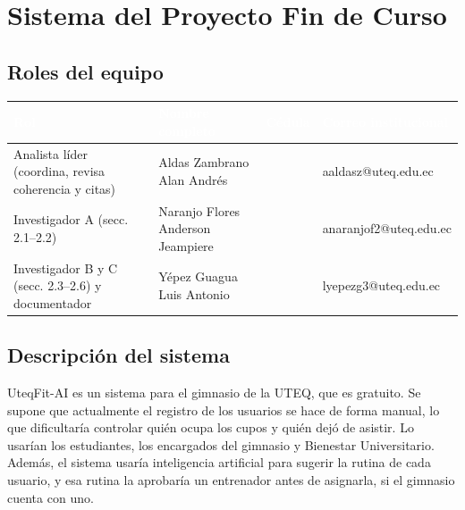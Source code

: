 \section{Sistema del Proyecto Fin de Curso}

\subsection{Roles del equipo}

\begin{center}
\small
\begin{tabularx}{\textwidth}{|>{\raggedright\arraybackslash}p{3.5cm}|L|>{\raggedright\arraybackslash}p{2.3cm}|>{\raggedright\arraybackslash}p{4.2cm}|}
\hline
{}\textcolor{white}{\textbf{Rol}} & \textcolor{white}{\textbf{Nombre completo}} & \textcolor{white}{\textbf{Cédula}} & \textcolor{white}{\textbf{Correo institucional}} \\ \hline
Analista líder (coordina, revisa coherencia y citas) & Aldas Zambrano Alan Andrés & & aaldasz@uteq.edu.ec \\ \hline
Investigador A (secc. 2.1--2.2) & Naranjo Flores Anderson Jeampiere & & anaranjof2@uteq.edu.ec \\ \hline
Investigador B y C (secc. 2.3--2.6) y documentador & Yépez Guagua Luis Antonio & & lyepezg3@uteq.edu.ec \\ \hline
\end{tabularx}
\end{center}

\subsection{Descripción del sistema}

UteqFit-AI es un sistema para el gimnasio de la UTEQ, que es gratuito. Se supone que actualmente el registro de los usuarios se hace de forma manual, lo que dificultaría controlar quién ocupa los cupos y quién dejó de asistir. Lo usarían los estudiantes, los encargados del gimnasio y Bienestar Universitario. Además, el sistema usaría inteligencia artificial para sugerir la rutina de cada usuario, y esa rutina la aprobaría un entrenador antes de asignarla, si el gimnasio cuenta con uno.

